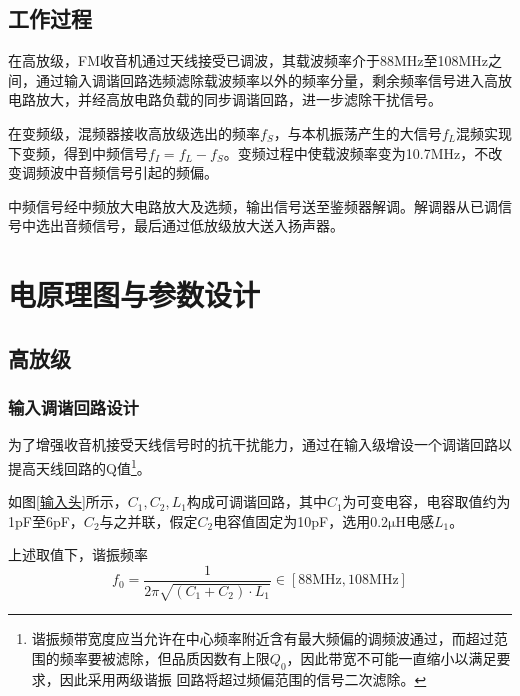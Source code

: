 \documentclass[a4paper,12pt,twoside]{article}
\begin{document}
\subsection{工作过程}
在高放级，FM收音机通过天线接受已调波，其载波频率介于88MHz至108MHz之间，通过输入调谐回路选频滤除载波频率以外的频率分量，剩余频率信号进入高放电路放大，并经高放电路负载的同步调谐回路，进一步滤除干扰信号。

在变频级，混频器接收高放级选出的频率$f_{S}$，与本机振荡产生的大信号$f_{L}$混频实现下变频，得到中频信号$f_{I} = f_L-f_S$。变频过程中使载波频率变为10.7MHz，不改变调频波中音频信号引起的频偏。

中频信号经中频放大电路放大及选频，输出信号送至鉴频器解调。解调器从已调信号中选出音频信号，最后通过低放级放大送入扬声器。

\section{电原理图与参数设计}
\subsection{高放级}
\subsubsection{输入调谐回路设计}
为了增强收音机接受天线信号时的抗干扰能力，通过在输入级增设一个调谐回路以提高天线回路的Q值\footnote{谐振频带宽度应当允许在中心频率附近含有最大频偏的调频波通过，而超过范围的频率要被滤除，但品质因数有上限$Q_0$，因此带宽不可能一直缩小以满足要求，因此采用两级谐振 回路将超过频偏范围的信号二次滤除。}。

如图\ref{输入头}所示，$C_1,C_2,L_1$构成可调谐回路，其中$C_1$为可变电容，电容取值约为1pF至6pF，$C_2$与之并联，假定$C_2$电容值固定为10pF，选用$0.2\mathrm{\mu H}$电感$L_1$。
    
    上述取值下，谐振频率
    \begin{equation}
        f_{0}=\frac{1}{2\pi \sqrt{(C_1+C_2)\cdot L_1}}\in [88\mathrm{MHz},108\mathrm{MHz}]
        \label{1式}
    \end{equation}
\end{document}
